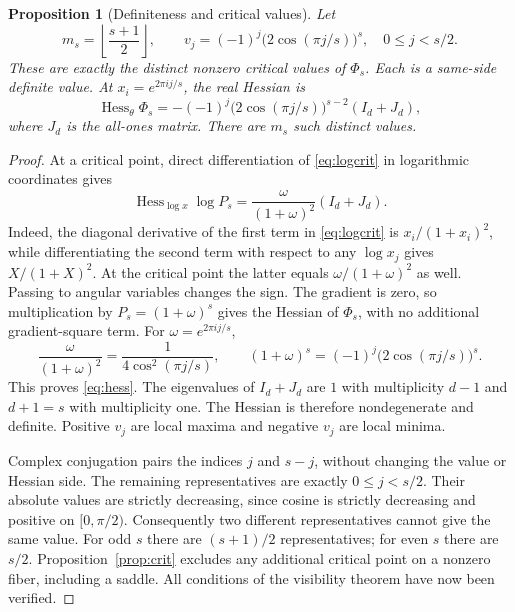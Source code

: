 \documentclass[11pt,a4paper]{article}
\newtheorem{proposition}[theorem]{Proposition}
\theoremstyle{definition}\newtheorem{definition}[theorem]{Definition}
\theoremstyle{remark}\newtheorem{remark}[theorem]{Remark}
\begin{document}
\begin{proposition}[Definiteness and critical values]\label{prop:hessian}
Let
\[
 m_s=\left\lfloor\frac{s+1}{2}\right\rfloor,\qquad
 v_j=(-1)^j\bigl(2\cos(\pi j/s)\bigr)^s,
 \quad 0\le j<s/2.
\]
These are exactly the distinct nonzero critical values of $\Phi_s$. Each is a
same-side definite value. At $x_i=e^{2\pi i j/s}$, the real Hessian is
\begin{equation}\label{eq:hess}
 \operatorname{Hess}_{\theta}\Phi_s
 =-(-1)^j\bigl(2\cos(\pi j/s)\bigr)^{s-2}(I_d+J_d),
\end{equation}
where $J_d$ is the all-ones matrix. There are $m_s$ such distinct values.
\end{proposition}
\begin{proof}
At a critical point, direct differentiation of \eqref{eq:logcrit} in
logarithmic coordinates gives
\[
 \operatorname{Hess}_{\log x}\log P_s
 =\frac{\omega}{(1+\omega)^2}(I_d+J_d).
\]
Indeed, the diagonal derivative of the first term in \eqref{eq:logcrit} is
$x_i/(1+x_i)^2$, while differentiating the second term with respect to any
$\log x_j$ gives $X/(1+X)^2$. At the critical point the latter equals
$\omega/(1+\omega)^2$ as well.
Passing to angular variables changes the sign. The gradient is zero, so
multiplication by $P_s=(1+\omega)^s$ gives the Hessian of $\Phi_s$, with no
additional gradient-square term. For $\omega=e^{2\pi i j/s}$,
\[
 \frac{\omega}{(1+\omega)^2}
    =\frac1{4\cos^2(\pi j/s)},\qquad
 (1+\omega)^s=(-1)^j\bigl(2\cos(\pi j/s)\bigr)^s.
\]
This proves \eqref{eq:hess}. The eigenvalues of $I_d+J_d$ are $1$ with
multiplicity $d-1$ and $d+1=s$ with multiplicity one. The Hessian is therefore
nondegenerate and definite. Positive $v_j$ are local maxima and negative
$v_j$ are local minima.

Complex conjugation pairs the indices $j$ and $s-j$, without changing the
value or Hessian side. The remaining representatives are exactly
$0\le j<s/2$. Their absolute values are strictly decreasing, since cosine is
strictly decreasing and positive on $[0,\pi/2)$. Consequently two different
representatives cannot give the same value. For odd $s$ there are $(s+1)/2$
representatives; for even $s$ there are $s/2$. Proposition~\ref{prop:crit}
excludes any additional critical point on a nonzero fiber, including a saddle.
All conditions of the visibility theorem have now been verified.
\end{proof}
\end{document}

